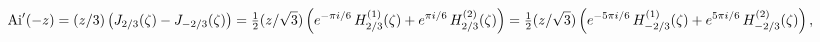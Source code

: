 \[\mathop{\mathrm{Ai}\/}\nolimits'\!\left(-z\right)=(z/3)\left(\mathop{J_{2/3}\/%
}\nolimits\!\left(\zeta\right)-\mathop{J_{-2/3}\/}\nolimits\!\left(\zeta\right%
)\right)=\tfrac{1}{2}(z/\sqrt{3})\left(e^{-\pi i/6}\mathop{{H^{(1)}_{2/3}}\/}%
\nolimits\!\left(\zeta\right)+e^{\pi i/6}\mathop{{H^{(2)}_{2/3}}\/}\nolimits\!%
\left(\zeta\right)\right)=\tfrac{1}{2}(z/\sqrt{3})\left(e^{-5\pi i/6}\mathop{{%
H^{(1)}_{-2/3}}\/}\nolimits\!\left(\zeta\right)+e^{5\pi i/6}\mathop{{H^{(2)}_{%
-2/3}}\/}\nolimits\!\left(\zeta\right)\right),\]